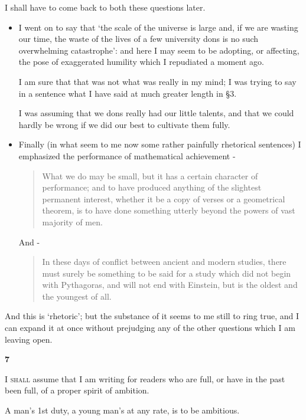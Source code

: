 \documentclass{article}
\numberwithin{equation}{section}
\begin{document}
I shall have to come back to both these questions later.
\begin{itemize}
    \item[(2)] I went on to say that `the scale of the universe is large and, if we are wasting our time, the waste of the lives of a few university dons is no such overwhelming catastrophe': and here I may seem to be adopting, or affecting, the pose of exaggerated humility which I repudiated a moment ago.
    
    I am sure that that was not what was really in my mind; I was trying to say in a sentence what I have said at much greater length in \S3.
    
    I was assuming that we dons really had our little talents, and that we could hardly be wrong if we did our best to cultivate them fully.
    \item[(3)] Finally (in what seem to me now some rather painfully rhetorical sentences) I emphasized the performance of mathematical achievement -
    \begin{quotation}
        What we do may be small, but it has a certain character of performance; and to have produced anything of the slightest permanent interest, whether it be a copy of verses or a geometrical theorem, is to have done something utterly beyond the powers of vast majority of men.
    \end{quotation}
    And -
    \begin{quotation}
        In these days of conflict between ancient and modern studies, there must surely be something to be said for a study which did not begin with Pythagoras, and will not end with Einstein, but is the oldest and the youngest of all.
    \end{quotation}
\end{itemize}
And this is `rhetoric'; but the substance of it seems to me still to ring true, and I can expand it at once without prejudging any of the other questions which I am leaving open.

\begin{center}
    \large\textbf{7}
\end{center}
\textsc{I shall} assume that I am writing for readers who are full, or have in the past been full, of a proper spirit of ambition.

A man's 1st duty, a young man's at any rate, is to be ambitious.
\end{document}
